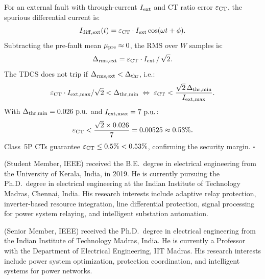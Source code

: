 \documentclass[journal,twoside,10pt]{IEEEtran}
\newcommand{\pu}{\,\text{p.u.}}
\begin{document}
For an external fault with through-current $I_{\rm ext}$ and CT ratio
error $\varepsilon_{\rm CT}$, the spurious differential current is:
\begin{equation}
  I_{\mathrm{diff,ext}}(t) = \varepsilon_{\rm CT} \cdot I_{\rm ext} \cos(\omega t + \phi).
\end{equation}
Subtracting the pre-fault mean $\mu_{\rm pre} \approx 0$, the RMS over
$W$ samples is:
\begin{equation}
  \Delta_{\rm rms,ext} = \varepsilon_{\rm CT} \cdot I_{\rm ext} \,/\, \sqrt{2}.
\end{equation}
The TDCS does not trip if $\Delta_{\rm rms,ext} < \Delta_{\rm thr}$, i.e.:
\begin{equation}
  \varepsilon_{\rm CT} \cdot I_{\rm ext,max} / \sqrt{2} < \Delta_{\rm thr,min}
  \;\Leftrightarrow\;
  \varepsilon_{\rm CT} < \frac{\sqrt{2}\,\Delta_{\rm thr,min}}{I_{\rm ext,max}}.
\end{equation}
With $\Delta_{\rm thr,min} = 0.026\,\pu$ and $I_{\rm ext,max} = 7\,\pu$:
\begin{equation}
  \varepsilon_{\rm CT} < \frac{\sqrt{2} \times 0.026}{7} = 0.00525
  \approx 0.53\%.
\end{equation}
Class~5P CTs guarantee $\varepsilon_{\rm CT} \leq 0.5\% < 0.53\%$,
confirming the security margin. $\square$




\vfill

(Student Member, IEEE) received the B.E.\ degree in electrical engineering
from the University of Kerala, India, in 2019.
He is currently pursuing the Ph.D.\ degree in electrical engineering at the
Indian Institute of Technology Madras, Chennai, India.
His research interests include adaptive relay protection, inverter-based
resource integration, line differential protection, signal processing for
power system relaying, and intelligent substation automation.

(Senior Member, IEEE) received the Ph.D.\ degree in electrical engineering
from the Indian Institute of Technology Madras, India.
He is currently a Professor with the Department of Electrical Engineering,
IIT Madras.
His research interests include power system optimization, protection
coordination, and intelligent systems for power networks.
\end{document}
